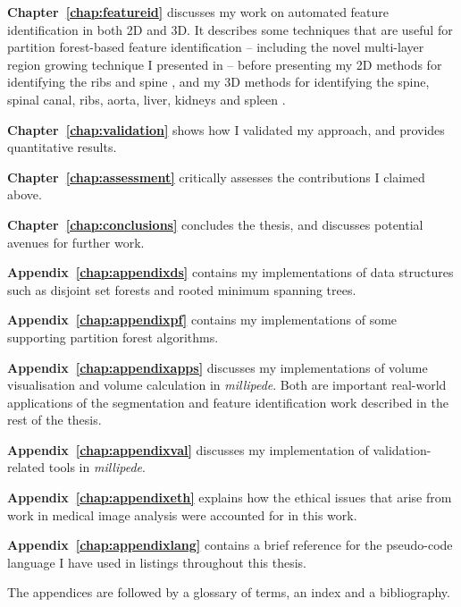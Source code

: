 \textbf{Chapter~\ref{chap:featureid}} discusses my work on automated feature identification in both 2D and 3D. It describes some techniques that are useful for partition forest-based feature identification -- including the novel multi-layer region growing technique I presented in \cite{gvcispa09} -- before presenting my 2D methods for identifying the ribs \cite{gvccimi08} and spine \cite{gvcispa09}, and my 3D methods for identifying the spine, spinal canal, ribs, aorta, liver, kidneys and spleen \cite{gvcoucl10}.

\textbf{Chapter~\ref{chap:validation}} shows how I validated my approach, and provides quantitative results.

\textbf{Chapter~\ref{chap:assessment}} critically assesses the contributions I claimed above.

\textbf{Chapter~\ref{chap:conclusions}} concludes the thesis, and discusses potential avenues for further work.

\textbf{Appendix~\ref{chap:appendixds}} contains my implementations of data structures such as disjoint set forests and rooted minimum spanning trees.

\textbf{Appendix~\ref{chap:appendixpf}} contains my implementations of some supporting partition forest algorithms.

\textbf{Appendix~\ref{chap:appendixapps}} discusses my implementations of volume visualisation and volume calculation in \emph{millipede}. Both are important real-world applications of the segmentation and feature identification work described in the rest of the thesis.

\textbf{Appendix~\ref{chap:appendixval}} discusses my implementation of validation-related tools in \emph{millipede}.

\textbf{Appendix~\ref{chap:appendixeth}} explains how the ethical issues that arise from work in medical image analysis were accounted for in this work.

\textbf{Appendix~\ref{chap:appendixlang}} contains a brief reference for the pseudo-code language I have used in listings throughout this thesis.

The appendices are followed by a glossary of terms, an index and a bibliography.
